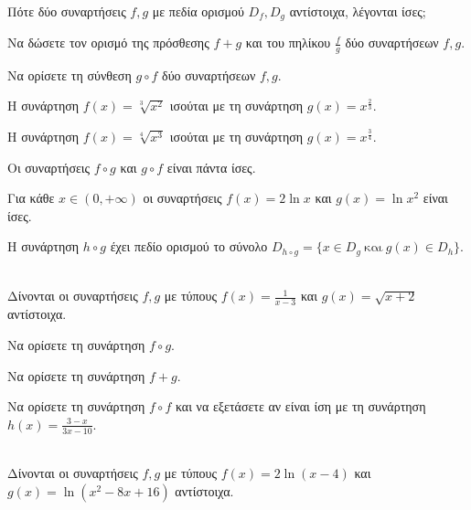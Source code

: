 \documentclass[twoside,nofonts,ektypwsh]{frontisthrio-diag}
\begin{document}
\begin{thema}
\item\mbox{}\\\vspace{-7mm}
\begin{erwthma}
\item Πότε δύο συναρτήσεις $ f,g $ με πεδία ορισμού $ D_f,D_g $ αντίστοιχα, λέγονται ίσες;
\item Να δώσετε τον ορισμό της πρόσθεσης $ f+g $ και του πηλίκου $ \frac{f}{g} $ δύο συναρτήσεων $ f,g $.
\item Να ορίσετε τη σύνθεση $ g\circ f $ δύο συναρτήσεων $ f,g $.
\item \swstolathospan
\begin{alist}
\item Η συνάρτηση $ f(x)=\sqrt[3]{x^2} $ ισούται με τη συνάρτηση $ g(x)=x^{\frac{2}{3}} $.
\item Η συνάρτηση $ f(x)=\sqrt[4]{x^3} $ ισούται με τη συνάρτηση $ g(x)=x^{\frac{3}{4}} $.
\item Οι συναρτήσεις $ f\circ g $ και $ g\circ f $ είναι πάντα ίσες.
\item Για κάθε $ x\in(0,+\infty) $ οι συναρτήσεις $ f(x)=2\ln{x} $ και $ g(x)=\ln{x^2} $ είναι ίσες.
\item Η συνάρτηση $ h\circ g $ έχει πεδίο ορισμού το σύνολο $ D_{h\circ g}=\{x\in D_g\ \textrm{και}\ g(x)\in D_h\} $.
\end{alist}
\end{erwthma}
\item\mbox{}\\
Δίνονται οι συναρτήσεις $ f,g $ με τύπους $ f(x)=\frac{1}{x-3} $ και $ g(x)=\sqrt{x+2} $ αντίστοιχα.
\begin{erwthma}
\item Να ορίσετε τη συνάρτηση $ f\circ g $.
\item Να ορίσετε τη συνάρτηση $ f+g $.
\item Να ορίσετε τη συνάρτηση $ f\circ f $ και να εξετάσετε αν είναι ίση με τη συνάρτηση $ h(x)=\frac{3-x}{3x-10} $.\\
\end{erwthma}
\item\mbox{}\\
Δίνονται οι συναρτήσεις $ f,g $ με τύπους $ f(x)=2\ln{\left(x-4\right)} $ και $ g(x)=\ln{\left(x^2-8x+16 \right) } $ αντίστοιχα.
\begin{erwthma}

\end{erwthma}
\end{thema}
\end{document}
